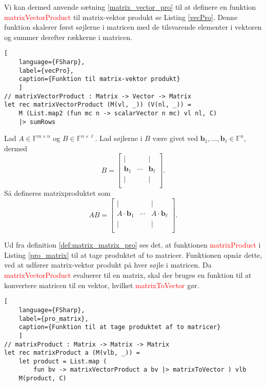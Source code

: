 Vi kan dermed anvende sætning \ref{matrix_vector_pro} til at definere en funktion \textcolor{red}{matrixVectorProduct} til matrix-vektor produkt se Listing \ref{vecPro}. Denne funktion skalerer først søjlerne i matricen med de tilsvarende elementer i vektoren og summer derefter rækkerne i matricen.
\begin{lstlisting}[
    language={FSharp}, 
    label={vecPro}, 
    caption={Funktion til matrix-vektor produkt}
    ]
// matrixVectorProduct : Matrix -> Vector -> Matrix
let rec matrixVectorProduct (M(vl, _)) (V(nl, _)) =
    M (List.map2 (fun mc n -> scalarVector n mc) vl nl, C) 
    |> sumRows
\end{lstlisting}

\begin{definition}\label{def:matrix_matrix_pro}
    Lad $A \in \mathbb{F}^{m \times n}$ og $B \in \mathbb{F}^{n \times \ell}$. Lad søjlerne i $B$ være givet ved $\mathbf{b}_1, \ldots, \mathbf{b}_\ell \in \mathbb{F}^n$, dermed
    \[
        B = \begin{bmatrix}
            | &  & | \\
            \mathbf{b}_1 & \cdots & \mathbf{b}_\ell \\
            | &  & | \\
        \end{bmatrix}.
    \]
    Så defineres matrixproduktet som
    \[
        AB = \begin{bmatrix}
            | &  & | \\
            A \cdot \mathbf{b}_1 & \cdots & A \cdot \mathbf{b}_\ell \\
            | &  & | \\
        \end{bmatrix}.
    \]
\end{definition}
Ud fra definition \ref{def:matrix_matrix_pro} ses det, at funktionen \textcolor{red}{matrixProduct} i Listing \ref{pro_matrix} til at tage produktet af to matricer. Funktionen opnår dette, ved at udfører matrix-vektor produkt på hver søjle i matricen. Da \textcolor{red}{matrixVectorProduct} evaluerer til en matrix, skal der bruges en funktion til at konvertere matricen til en vektor, hvilket \textcolor{red}{matrixToVector} gør.
\begin{lstlisting}[
    language={FSharp}, 
    label={pro_matrix}, 
    caption={Funktion til at tage produktet af to matricer}
    ]
// matrixProduct : Matrix -> Matrix -> Matrix
let rec matrixProduct a (M(vlb, _)) =
    let product = List.map (
        fun bv -> matrixVectorProduct a bv |> matrixToVector ) vlb
    M(product, C)
\end{lstlisting}
        
